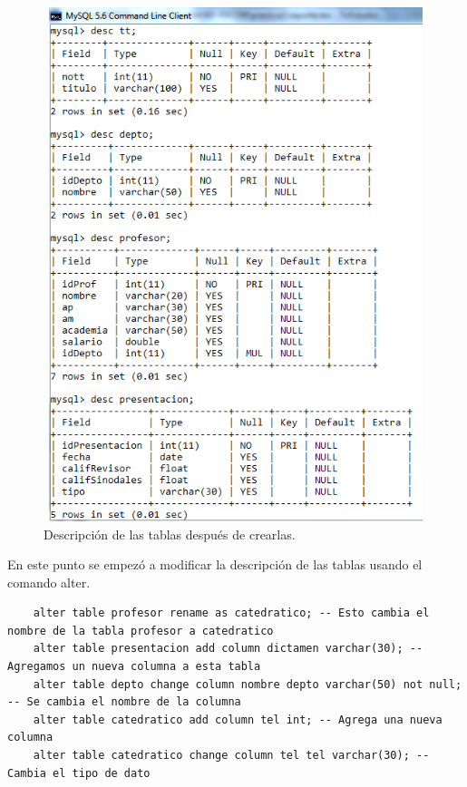 \documentclass[12pt, titlepage]{article}
\begin{document}
    \begin{figure}[H]
        \begin{center}
            \includegraphics[width=16cm, height=15cm]{img/tablas.png}
            \caption{Descripción de las tablas después de crearlas.}
            \label{fig:tablas}
        \end{center}
    \end{figure}
    En este punto se empezó a modificar la descripción de las tablas usando el comando alter.
    \begin{lstlisting}
    alter table profesor rename as catedratico; -- Esto cambia el nombre de la tabla profesor a catedratico
    alter table presentacion add column dictamen varchar(30); --Agregamos un nueva columna a esta tabla
    alter table depto change column nombre depto varchar(50) not null; -- Se cambia el nombre de la columna 
    alter table catedratico add column tel int; -- Agrega una nueva columna
    alter table catedratico change column tel tel varchar(30); -- Cambia el tipo de dato
    \end{lstlisting}
\end{document}
